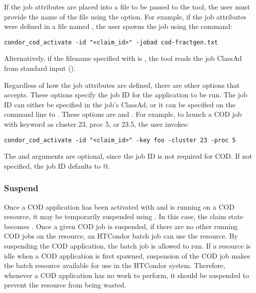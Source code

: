 If the job attributes are placed into a file to be passed to the
 tool,
the user must provide the
name of the file using the  option.
For example, if the job attributes were defined in a file named
, the user spawns the job using the
command:
\begin{verbatim}
condor_cod_activate -id "<claim_id>" -jobad cod-fractgen.txt
\end{verbatim}
Alternatively, if the filename specified with  is
\File{-}, the  tool reads the job ClassAd from
standard input ().

Regardless of how the job attributes are defined, there are
other options that  accepts.
These options specify the job ID for the application to be run.
The job ID can either be specified in the job's ClassAd, 
or it can be
specified on the command line to .
These options are  and .
For example, to launch a COD job with keyword \verb@foo@
as cluster 23, proc 5, or 23.5,
the user invokes:
\begin{verbatim}
condor_cod_activate -id "<claim_id>" -key foo -cluster 23 -proc 5
\end{verbatim}
The  and  arguments are optional,
since the job ID is not required for COD.
If not specified, the job ID defaults to @.


\subsubsection{\label{sec:cod-claim-suspend}Suspend}

Once a COD application has been activated with 
and is running on a COD resource, it may be temporarily suspended
using .
In this case, the claim state becomes \verb@Suspended@.
Once a given COD job is suspended, if there are no other running COD
jobs on the resource, an HTCondor batch job can use the resource.
By suspending the COD application, the batch job is allowed to run.
If a resource is idle when a COD application is first spawned,
suspension of the COD job makes the batch resource available
for use in the HTCondor system.
Therefore, whenever a COD application has no work to perform, it should be
suspended to prevent the resource from being wasted.

